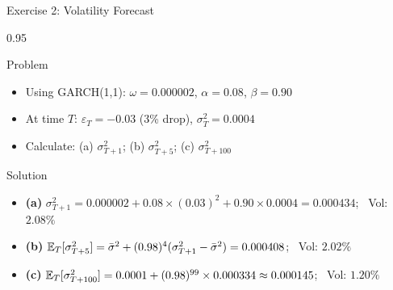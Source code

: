 \documentclass[9pt, aspectratio=169, t]{beamer}
\begin{document}
\begin{frame}{Exercise 2: Volatility Forecast}
    \begin{cminipage}{0.95\textwidth}
    \begin{alertblock}{Problem}
        \begin{itemize}\setlength{\itemsep}{0pt}
            \item Using GARCH(1,1): $\omega = 0.000002$, $\alpha = 0.08$, $\beta = 0.90$
            \item At time $T$: $\varepsilon_T = -0.03$ (3\% drop), $\sigma_T^2 = 0.0004$
            \item Calculate: (a) $\sigma_{T+1}^2$; (b) $\sigma_{T+5}^2$; (c) $\sigma_{T+100}^2$
        \end{itemize}
    \end{alertblock}

    \vspace{0.2cm}
    \begin{exampleblock}{Solution}
        \begin{itemize}\setlength{\itemsep}{0pt}
            \item \textbf{(a)} $\sigma_{T+1}^2 = 0.000002 + 0.08 \times (0.03)^2 + 0.90 \times 0.0004 = 0.000434$; \ Vol: $2.08\%$
            \item \textbf{(b)} $\mathbb{E}_T[\sigma_{T+5}^2] = \bar{\sigma}^2 + (0.98)^4 (\sigma_{T+1}^2 - \bar{\sigma}^2) = 0.000408$; \ Vol: $2.02\%$
            \item \textbf{(c)} $\mathbb{E}_T[\sigma_{T+100}^2] = 0.0001 + (0.98)^{99} \times 0.000334 \approx 0.000145$; \ Vol: $1.20\%$
        \end{itemize}
    \end{exampleblock}
    \end{cminipage}
\end{frame}
\end{document}
